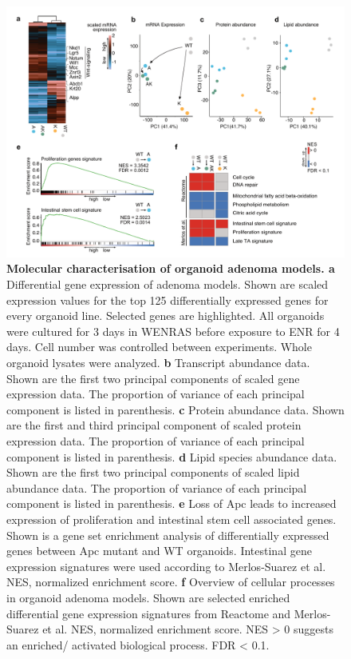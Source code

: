 \begin{flushleft}
\begin{figure}[H]
\centering
\includegraphics[width=\textwidth,
                height=\textheight,
                keepaspectratio]{figures/adenomaprofiling/pdf/fig_1_6_1_2.pdf}
\caption[Molecular characterisation of organoid adenoma models]{\textbf{Molecular characterisation of organoid adenoma models. a} Differential gene expression of adenoma models. Shown are scaled expression values for the top 125 differentially expressed genes for every organoid line. Selected genes are highlighted. All organoids were cultured for 3 days in WENRAS before exposure to ENR for 4 days. Cell number was controlled between experiments. Whole organoid lysates were analyzed. 
\textbf{b} Transcript abundance data. Shown are the first two principal components of scaled gene expression data. The proportion of variance of each principal component is listed in parenthesis. 
\textbf{c} Protein abundance data. Shown are the first and third principal component of scaled protein expression data. The proportion of variance of each principal component is listed in parenthesis. 
\textbf{d} Lipid species abundance data. Shown are the first two principal components of scaled lipid abundance data. The proportion of variance of each principal component is listed in parenthesis. 
\textbf{e} Loss of Apc leads to increased expression of proliferation and intestinal stem cell associated genes. Shown is a gene set enrichment analysis of differentially expressed genes between Apc mutant and WT organoids. Intestinal gene expression signatures were used according to Merlos-Suarez et al. NES, normalized enrichment score. 
\textbf{f} Overview of cellular processes in organoid adenoma models. Shown are selected enriched differential gene expression signatures from Reactome and Merlos-Suarez et al. NES, normalized enrichment score. NES > 0 suggests an enriched/ activated biological process. FDR < 0.1.}
\label{fig_161}
\end{figure}
\bigbreak


\end{flushleft}
